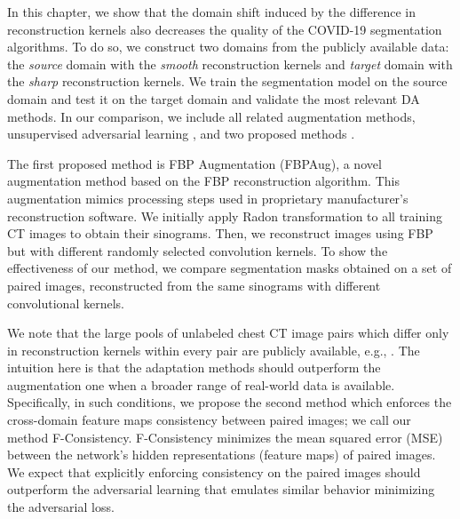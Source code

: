 In this chapter, we show that the domain shift induced by the difference in reconstruction kernels also decreases the quality of the COVID-19 segmentation algorithms. To do so, we construct two domains from the publicly available data: the \textit{source} domain with the \textit{smooth} reconstruction kernels and \textit{target} domain with the \textit{sharp} reconstruction kernels. We train the segmentation model on the source domain and test it on the target domain and validate the most relevant DA methods. In our comparison, we include all related augmentation methods, unsupervised adversarial learning \cite{dann}, and two proposed methods \cite{saparov2021zero,shimovolos2022adaptation}.
 
The first proposed method is FBP Augmentation (FBPAug), a novel augmentation method based on the FBP reconstruction algorithm. This augmentation mimics processing steps used in proprietary manufacturer's reconstruction software. We initially apply Radon transformation to all training CT images to obtain their sinograms. Then, we reconstruct images using FBP but with different randomly selected convolution kernels. To show the effectiveness of our method, we compare segmentation masks obtained on a set of paired images, reconstructed from the same sinograms with different convolutional kernels.%

We note that the large pools of unlabeled chest CT image pairs which differ only in reconstruction kernels within every pair are publicly available, e.g., \cite{morozov2021simplified}. The intuition here is that the adaptation methods should outperform the augmentation one when a broader range of real-world data is available. Specifically, in such conditions, we propose the second method which enforces the cross-domain feature maps consistency between paired images; we call our method F-Consistency. F-Consistency minimizes the mean squared error (MSE) between the network’s hidden representations (feature maps) of paired images. We expect that explicitly enforcing consistency on the paired images should outperform the adversarial learning that emulates similar behavior minimizing the adversarial loss.

